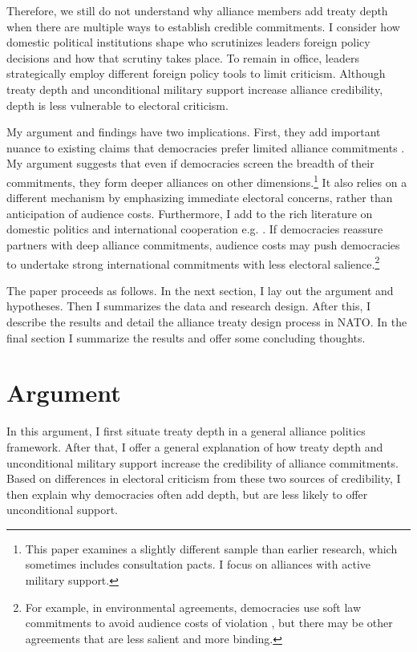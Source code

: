 \documentclass[12pt]{article}
\begin{document}
Therefore, we still do not understand why alliance members add treaty depth when there are multiple ways to establish credible commitments. 
I consider how domestic political institutions shape who scrutinizes leaders foreign policy decisions and how that scrutiny takes place.
To remain in office, leaders strategically employ different foreign policy tools to limit criticism. 
Although treaty depth and unconditional military support increase alliance credibility, depth is less vulnerable to electoral criticism. 


My argument and findings have two implications. 
First, they add important nuance to existing claims that democracies prefer limited alliance commitments \citep{Mattes2012, Chibaetal2015, FjelstulReiter2019}. 
My argument suggests that even if democracies screen the breadth of their commitments, they form deeper alliances on other dimensions.\footnote{This paper examines a slightly different sample than earlier research, which sometimes includes consultation pacts. I focus on alliances with active military support.}  
It also relies on a different mechanism by emphasizing immediate electoral concerns, rather than anticipation of audience costs.
Furthermore, I add to the rich literature on domestic politics and international cooperation e.g. \citep{DownesRocke1995, Fearon1998, Leeds1999, MattesRodriguez2014}. 
If democracies reassure partners with deep alliance commitments, audience costs may push democracies to undertake strong international commitments with less electoral salience.\footnote{For example, in environmental agreements, democracies use soft law commitments to avoid audience costs of violation \citep{BoehmeltButkute2018}, but there may be other agreements that are less salient and more binding.} 


The paper proceeds as follows. 
In the next section, I lay out the argument and hypotheses. 
Then I summarizes the data and research design. 
After this, I describe the results and detail the alliance treaty design process in NATO.
In the final section I summarize the results and offer some concluding thoughts. 


\section{Argument}


In this argument, I first situate treaty depth in a general alliance politics framework.  
After that, I offer a general explanation of how treaty depth and unconditional military support increase the credibility of alliance commitments. 
Based on differences in electoral criticism from these two sources of credibility, I then explain why democracies often add depth, but are less likely to offer unconditional support. 
\end{document}
